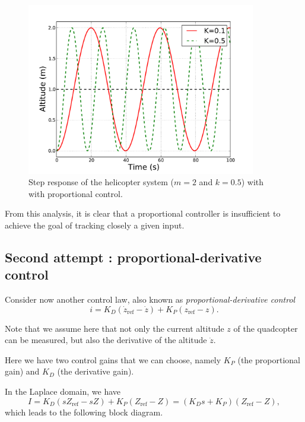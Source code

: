 \documentclass[a4paper,11pt]{report}
\theoremstyle{definition}
\newcommand{\re}{\mathrm{ref}}
\begin{document}
\begin{figure}[H]
  \centering
  \includegraphics[width=10cm]{fig/stepresp.pdf}
  \caption{Step response of the helicopter system ($m=2$ and $k=0.5$)
    with with proportional control.}
  \label{fig:stepresp}
\end{figure}


From this analysis, it is clear that a proportional controller is
insufficient to achieve the goal of tracking closely a given input. 


\subsection{Second attempt : proportional-derivative control}
\label{sec:pdhelico}

Consider now another control law, also known as
\emph{proportional-derivative control}
\[
i = K_D(\dot z_\re - \dot z) + K_P\left(z_\re - z\right).
\]

Note that we assume here that not only the current altitude $z$ of the
quadcopter can be measured, but also the derivative of the altitude
$\dot z$.

Here we have two control gains that we can choose, namely $K_P$ (the
proportional gain) and $K_D$ (the derivative gain).

In the Laplace domain, we have
\[
I = K_D(sZ_\re-sZ) + K_P(Z_\re-Z) = (K_Ds+K_P)(Z_\re-Z),
\]
which leads to the following block diagram.
\end{document}
